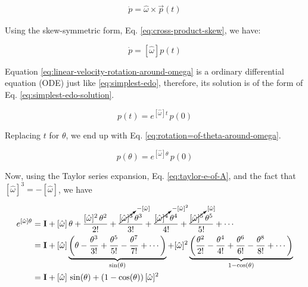 \documentclass[12pt]{article}
\begin{document}
\begin{equation} \begin{aligned}
    \dot{p} = \hat{\omega} \times \vec{p}(t)
    \end{aligned}
    \label{eq:velocity-of-rotation-around-omega}
\end{equation}

Using the skew-symmetric form, Eq. \ref{eq:cross-product-skew}, we have:

\begin{equation}
    \dot{p} = \left[ \hat{\omega} \right] p(t)
    \label{eq:linear-velocity-rotation-around-omega}
\end{equation}

Equation \ref{eq:linear-velocity-rotation-around-omega} is a ordinary differential equation (ODE) just like \ref{eq:simplest-edo}, therefore, its solution is of the form of Eq. \ref{eq:simplest-edo-solution}.

\begin{equation*}
    p(t) = e^{\left[ \hat{\omega} \right] t} \, p(0)
\end{equation*}

Replacing $t$ for $\theta$, we end up with Eq. \ref{eq:rotation=of-theta-around-omega}.

\begin{equation}
    p(\theta) = e^{\left[ \hat{\omega} \right] \theta} \, p(0)
    \label{eq:rotation=of-theta-around-omega}
\end{equation}

Now, using the Taylor series expansion, Eq. \ref{eq:taylor-e-of-A}, and the fact that $[\hat{\omega}]^3 = -[\hat{\omega}]$, we have

\begin{equation}\begin{aligned}
    e^{[\hat{\omega}]\theta} &= \mathbf{I} + [\hat{\omega}] \, \theta + \frac{[\hat{\omega}]^2 \, \theta^2}{2!} + \frac{\cancelto{-[\hat{\omega}]}{[\hat{\omega}]^3} \, \theta^3}{3!} + \frac{\cancelto{-[\hat{\omega}]^2}{[\hat{\omega}]^4} \, \theta^4}{4!} + \frac{\cancelto{[\hat{\omega}]}{[\hat{\omega}]^5} \, \theta^5}{5!} + \cdots \\
    &= \mathbf{I} + [\hat{\omega}] \underbrace{\left( \theta - \frac{\theta^3}{3!} + \frac{\theta^5}{5!} - \frac{\theta^7}{7!} + \cdots \right)}_{\sin(\theta)} + [\hat{\omega}]^2 \underbrace{\left( \frac{\theta^2}{2!} - \frac{\theta^4}{4!} + \frac{\theta^6}{6!} - \frac{\theta^8}{8!} + \cdots \right)}_{1 - \cos(\theta)} \\
    &= \mathbf{I} + [\hat{\omega}] \, \sin(\theta) + (1 - \cos(\theta)) \, [\hat{\omega}]^2
\end{aligned}
\label{eq:rodrigues-rotation-matrix-formula}
\end{equation}
\end{document}
